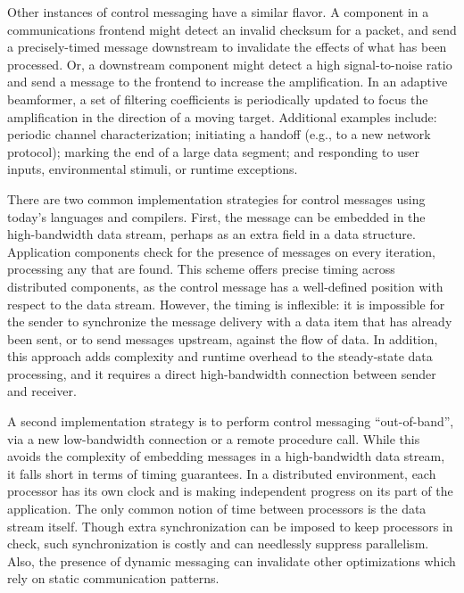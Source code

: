 Other instances of control messaging have a similar flavor.  A
component in a communications frontend might detect an invalid
checksum for a packet, and send a precisely-timed message downstream
to invalidate the effects of what has been processed.  Or, a
downstream component might detect a high signal-to-noise ratio and
send a message to the frontend to increase the amplification.  In an
adaptive beamformer, a set of filtering coefficients is periodically
updated to focus the amplification in the direction of a moving
target.  Additional examples include: periodic channel
characterization; initiating a handoff (e.g., to a new network
protocol); marking the end of a large data segment; and responding to
user inputs, environmental stimuli, or runtime exceptions.

There are two common implementation strategies for control messages
using today's languages and compilers.  First, the message can be
embedded in the high-bandwidth data stream, perhaps as an extra field
in a data structure.  Application components check for the presence of
messages on every iteration, processing any that are found.  This
scheme offers precise timing across distributed components, as the
control message has a well-defined position with respect to the data
stream.  However, the timing is inflexible: it is impossible for the
sender to synchronize the message delivery with a data item that has
already been sent, or to send messages upstream, against the flow of
data.  In addition, this approach adds complexity and runtime overhead
to the steady-state data processing, and it requires a direct
high-bandwidth connection between sender and receiver.

A second implementation strategy is to perform control messaging
``out-of-band'', via a new low-bandwidth connection or a remote
procedure call.  While this avoids the complexity of embedding
messages in a high-bandwidth data stream, it falls short in terms of
timing guarantees.  In a distributed environment, each processor has
its own clock and is making independent progress on its part of the
application.  The only common notion of time between processors is the
data stream itself.  Though extra synchronization can be imposed to
keep processors in check, such synchronization is costly and can
needlessly suppress parallelism.  Also, the presence of dynamic
messaging can invalidate other optimizations which rely on static
communication patterns.

